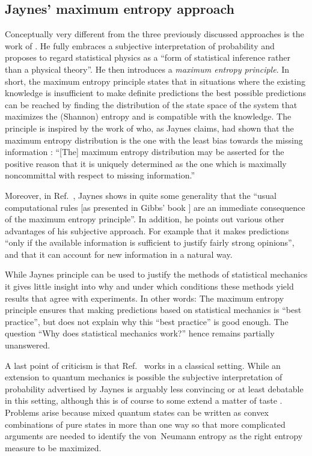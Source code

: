 \documentclass[a4paper,12pt,listof=totoc,index=totoc,bibliography=totoc,headsepline=false,headings=normal,BCOR16.153846mm,DIV12,headinclude,twoside,cleardoublepage=empty,numbers=noenddot,final]{scrreprt}
\theoremstyle{mystyle}
\numberwithin{equation}{section}
\numberwithin{figure}{section}
\numberwithin{lemma}{section}
\numberwithin{theorem}{section}
\numberwithin{corollary}{section}
\numberwithin{definition}{section}
\numberwithin{conjecture}{section}
\numberwithin{observation}{section}
\newcommand{\+}{\mkern2mu}
\DeclareMathOperator{\1}{\mathds{1}}
\begin{document}
\subsection{Jaynes' maximum entropy approach}
\label{sec:jaynesmaximumentropyapproach}
%
Conceptually very different from the three previously discussed approaches is the work of \textcite{Jaynes}.
He fully embraces a subjective interpretation of probability and proposes to regard statistical physics as a ``form of statistical inference rather than a physical theory''.
He then introduces a \emph{maximum entropy principle}.
In short, the maximum entropy principle states that in situations where the existing knowledge is insufficient to make definite predictions the best possible predictions can be reached by finding the distribution of the state space of the system that maximizes the (Shannon) entropy and is compatible with the knowledge.
The principle is inspired by the work of \textcite{Shannon1949} who, as Jaynes claims, had shown that the maximum entropy distribution is the one with the least bias towards the missing information \cite{Jaynes}: ``[The] maximum entropy distribution may be asserted for the positive reason that it is uniquely determined as the one which is maximally noncommittal with respect to missing information.''

Moreover, in Ref.~\cite{Jaynes}, Jaynes shows in quite some generality that the ``usual computational rules [as presented in Gibbs' book \cite{Gibbs1902}] are an immediate consequence of the maximum entropy principle''.
In addition, he points out various other advantages of his subjective approach.
For example that it makes predictions ``only if the available information is sufficient to justify fairly strong opinions'', and that it can account for new information in a natural way.

While Jaynes principle can be used to justify the methods of statistical mechanics it gives little insight into why and under which conditions these methods yield results that agree with experiments.
In other words: The maximum entropy principle ensures that making predictions based on statistical mechanics is ``best practice'', but does not explain why this ``best practice'' is good enough.
The question ``Why does statistical mechanics work?'' hence remains partially unanswered.

A last point of criticism is that Ref.~\cite{Jaynes} works in a classical setting.
While an extension to quantum mechanics is possible \cite{PhysRev.108.17} the subjective interpretation of probability advertised by Jaynes is arguably less convincing or at least debatable in this setting, although this is of course to some extend a matter of taste \cite{Fuchs,Timpson2008}.
Problems arise because mixed quantum states can be written as convex combinations of pure states in more than one way so that more complicated arguments are needed to identify the von~Neumann entropy as the right entropy measure to be maximized.
\end{document}
